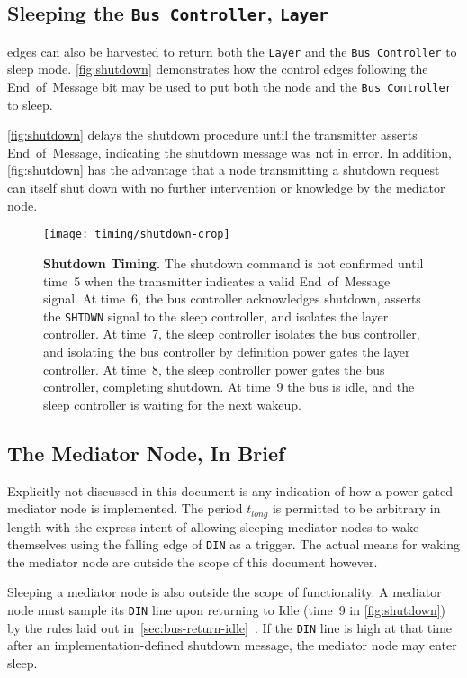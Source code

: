 \subsection{Sleeping the {\tt Bus Controller}, {\tt Layer}}
\bus edges can also be harvested to return both the {\tt Layer} and the
{\tt Bus~Controller} to sleep mode. \autoref{fig:shutdown} demonstrates how
the control edges following the End~of~Message bit may be used to put both the
node and the {\tt Bus~Controller} to sleep.

\autoref{fig:shutdown} delays the shutdown procedure until the transmitter
asserts End~of~Message, indicating the shutdown message was not in error.
In addition, \autoref{fig:shutdown} has the advantage that a node transmitting
a shutdown request can itself shut down with no further intervention or
knowledge by the mediator node.

\begin{figure}
  \centering
  \texttt{[image: timing/shutdown-crop]}
  \caption{\textbf{Shutdown Timing.} \textmd{
    The shutdown command is not confirmed until time~5 when the transmitter
    indicates a valid End~of~Message signal. At time~6, the bus controller
    acknowledges shutdown, asserts the {\tt SHTDWN} signal to the sleep
    controller, and isolates the layer controller. At time~7, the sleep
    controller isolates the bus controller, and isolating the bus controller
    by definition power gates the layer controller. At time~8, the sleep
    controller power gates the bus controller, completing shutdown. At time~9
    the bus is idle, and the sleep controller is waiting for the next wakeup.
  }}
  \label{fig:shutdown}
\end{figure}

\subsection{The Mediator Node, In Brief}
Explicitly not discussed in this document is any indication of how a
power-gated mediator node is implemented. The period $t_{long}$ is permitted to
be arbitrary in length with the express intent of allowing sleeping mediator
nodes to wake themselves using the falling edge of {\tt DIN} as a trigger. The
actual means for waking the mediator node are outside the scope of this
document however.

Sleeping a mediator node is also outside the scope of \bus functionality.
A mediator node must sample its {\tt DIN} line upon returning to Idle (time~9
in \autoref{fig:shutdown}) by the rules laid out
in~\ref{sec:bus-return-idle}~. If the
{\tt DIN} line is high at that time after an implementation-defined shutdown
message, the mediator node may enter sleep.
